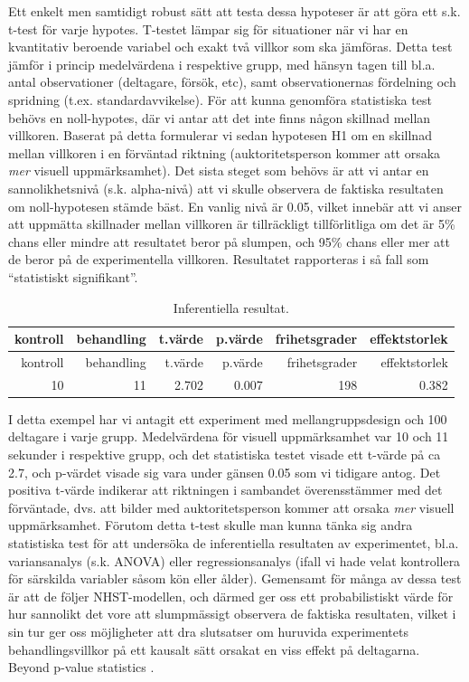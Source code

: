 \documentclass[
]{book}
\begin{document}
Ett enkelt men samtidigt robust sätt att testa dessa hypoteser är att göra ett s.k. t-test för varje hypotes. T-testet lämpar sig för situationer när vi har en kvantitativ beroende variabel och exakt två villkor som ska jämföras. Detta test jämför i princip medelvärdena i respektive grupp, med hänsyn tagen till bl.a. antal observationer (deltagare, försök, etc), samt observationernas fördelning och spridning (t.ex. standardavvikelse). För att kunna genomföra statistiska test behövs en noll-hypotes, där vi antar att det inte finns någon skillnad mellan villkoren. Baserat på detta formulerar vi sedan hypotesen H1 om en skillnad mellan villkoren i en förväntad riktning (auktoritetsperson kommer att orsaka \emph{mer} visuell uppmärksamhet). Det sista steget som behövs är att vi antar en sannolikhetsnivå (s.k. alpha-nivå) att vi skulle observera de faktiska resultaten om noll-hypotesen stämde bäst. En vanlig nivå är 0.05, vilket innebär att vi anser att uppmätta skillnader mellan villkoren är tillräckligt tillförlitliga om det är 5\% chans eller mindre att resultatet beror på slumpen, och 95\% chans eller mer att de beror på de experimentella villkoren. Resultatet rapporteras i så fall som ``statistiskt signifikant''.

\begin{longtable}[]{@{}rrrrrr@{}}
\caption{\label{tab:tab-02-08-1-2}Inferentiella resultat.}\tabularnewline
\toprule
kontroll & behandling & t.värde & p.värde & frihetsgrader & effektstorlek\tabularnewline
\midrule
\endfirsthead
\toprule
kontroll & behandling & t.värde & p.värde & frihetsgrader & effektstorlek\tabularnewline
\midrule
\endhead
10 & 11 & 2.702 & 0.007 & 198 & 0.382\tabularnewline
\bottomrule
\end{longtable}

I detta exempel har vi antagit ett experiment med mellangruppsdesign och 100 deltagare i varje grupp. Medelvärdena för visuell uppmärksamhet var 10 och 11 sekunder i respektive grupp, och det statistiska testet visade ett t-värde på ca 2.7, och p-värdet visade sig vara under gänsen 0.05 som vi tidigare antog. Det positiva t-värde indikerar att riktningen i sambandet överensstämmer med det förväntade, dvs. att bilder med auktoritetsperson kommer att orsaka \emph{mer} visuell uppmärksamhet. Förutom detta t-test skulle man kunna tänka sig andra statistiska test för att undersöka de inferentiella resultaten av experimentet, bl.a. variansanalys (s.k. ANOVA) eller regressionsanalys (ifall vi hade velat kontrollera för särskilda variabler såsom kön eller ålder). Gemensamt för många av dessa test är att de följer NHST-modellen, och därmed ger oss ett probabilistiskt värde för hur sannolikt det vore att slumpmässigt observera de faktiska resultaten, vilket i sin tur ger oss möjligheter att dra slutsatser om huruvida experimentets behandlingsvillkor på ett kausalt sätt orsakat en viss effekt på deltagarna. Beyond p-value statistics \citep{trafimow2015editorial}.
\end{document}
